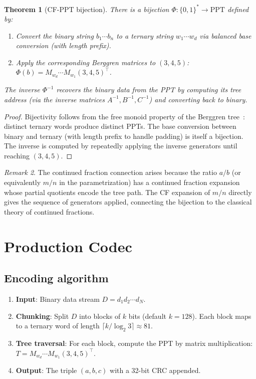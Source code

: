 \documentclass[12pt]{amsart}
\newtheorem{theorem}{Theorem}[section]
\theoremstyle{definition}
\theoremstyle{remark}
\newtheorem{remark}[theorem]{Remark}
\begin{document}
\begin{theorem}[CF-PPT bijection]\label{thm:bijection}
There is a bijection $\Phi : \{0,1\}^* \to \mathrm{PPT}$ defined by:
\begin{enumerate}[label=(\roman*)]
  \item Convert the binary string $b_1 \cdots b_n$ to a ternary string
    $w_1 \cdots w_d$ via balanced base conversion (with length prefix).
  \item Apply the corresponding Berggren matrices to $(3,4,5)$:
    $\Phi(b) = M_{w_d} \cdots M_{w_1} (3,4,5)^\top$.
\end{enumerate}
The inverse $\Phi^{-1}$ recovers the binary data from the PPT by computing
its tree address (via the inverse matrices $A^{-1}, B^{-1}, C^{-1}$) and
converting back to binary.
\end{theorem}

\begin{proof}
Bijectivity follows from the free monoid property of the Berggren
tree~\cite{PaperAlgebra}: distinct ternary words produce distinct PPTs.
The base conversion between binary and ternary (with length prefix to handle
padding) is itself a bijection. The inverse is computed by repeatedly
applying the inverse generators until reaching $(3,4,5)$.
\end{proof}

\begin{remark}
The continued fraction connection arises because the ratio $a/b$ (or
equivalently $m/n$ in the parametrization) has a continued fraction expansion
whose partial quotients encode the tree path. The CF expansion of $m/n$
directly gives the sequence of generators applied, connecting the bijection
to the classical theory of continued fractions.
\end{remark}

\section{Production Codec}\label{sec:codec}

\subsection{Encoding algorithm}

\begin{enumerate}
  \item \textbf{Input}: Binary data stream $D = d_1 d_2 \cdots d_N$.
  \item \textbf{Chunking}: Split $D$ into blocks of $k$ bits (default
    $k = 128$). Each block maps to a ternary word of length
    $\lceil k / \log_2 3 \rceil \approx 81$.
  \item \textbf{Tree traversal}: For each block, compute the PPT by
    matrix multiplication: $T = M_{w_d} \cdots M_{w_1} (3,4,5)^\top$.
  \item \textbf{Output}: The triple $(a, b, c)$ with a 32-bit CRC appended.
\end{enumerate}
\end{document}
